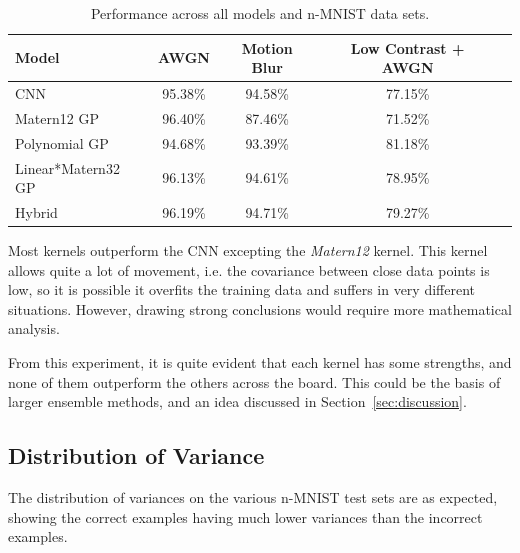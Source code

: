 \documentclass{article}
\begin{document}
\begin{table}[t]
\caption{Performance across all models and n-MNIST data sets.}
\vskip 0.15in
\begin{center}
\begin{small}
\begin{sc}
\begin{tabular}{lcccr}
\toprule
Model 				& AWGN 	& Motion Blur	& Low Contrast + AWGN \\
\midrule
CNN    				& 95.38\% 	& 94.58\%	& 77.15\%   \\
Matern12 GP	 		& 96.40\%	& 87.46\%	& 71.52\%    \\
Polynomial GP    	& 94.68\%	& 93.39\%	& 81.18\%  	  \\
Linear*Matern32 GP	& 96.13\%	& 94.61\% 	& 78.95\%   \\
Hybrid    			& 96.19\%	& 94.71\% 	& 79.27\%   \\
\bottomrule
\end{tabular}
\end{sc}
\end{small}
\end{center}
\vskip -0.1in
\label{tab:adv:accuracies}
\end{table}



Most kernels outperform the CNN excepting the \textit{Matern12} kernel. This kernel allows quite a lot of movement, i.e. the covariance between close data points is low, so it is possible it overfits the training data and suffers in very different situations. However, drawing strong conclusions would require more mathematical analysis.

From this experiment, it is quite evident that each kernel has some strengths, and none of them outperform the others across the board. This could be the basis of larger ensemble methods, and an idea discussed in Section~\ref{sec:discussion}.

\subsection{Distribution of Variance}

The distribution of variances on the various n-MNIST test sets are as expected, showing the correct examples having much lower variances than the incorrect examples.
\end{document}
